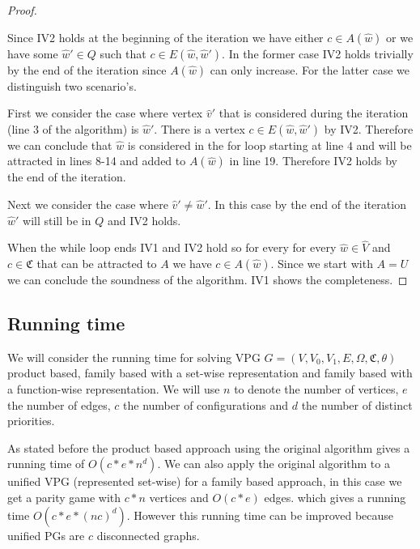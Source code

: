 \begin{theorem}
\begin{proof}
\begin{itemize}
			Since IV2 holds at the beginning of the iteration we have either $c \in A(\hat{w})$ or we have some $\hat{w}' \in Q$ such that $c \in E(\hat{w},\hat{w}')$. In the former case IV2 holds trivially by the end of the iteration since $A(\hat{w})$ can only increase. For the latter case we distinguish two scenario's. 
			
			First we consider the case where vertex $\hat{v}'$ that is considered during the iteration (line 3 of the algorithm) is $\hat{w}'$. There is a vertex $c \in E(\hat{w},\hat{w}')$ by IV2. Therefore we can conclude that $\hat{w}$ is considered in the for loop starting at line $4$ and will be attracted in lines 8-14 and added to $A(\hat{w})$ in line 19. Therefore IV2 holds by the end of the iteration.
			
			Next we consider the case where $\hat{v}' \neq \hat{w}'$. In this case by the end of the iteration $\hat{w}'$ will still be in $Q$ and IV2 holds.
		\end{itemize}
	
		When the while loop ends IV1 and IV2 hold so for every for every $\hat{w} \in \hat{V}$ and $c \in \mathfrak{C}$ that can be attracted to $A$ we have $c \in A(\hat{w})$. Since we start with $A = U$ we can conclude the soundness of the algorithm. IV1 shows the completeness.
	\end{proof}
\end{theorem}


\subsection{Running time}
We will consider the running time for solving VPG $G = (V,V_0,V_1,E,\Omega,\mathfrak{C},\theta)$ product based, family based with a set-wise representation and family based with a function-wise representation. We will use $n$ to denote the number of vertices, $e$ the number of edges, $c$ the number of configurations and $d$ the number of distinct priorities.

As stated before the product based approach using the original algorithm gives a running time of $O(c * e * n^d)$. We can also apply the original algorithm to a unified VPG (represented set-wise) for a family based approach, in this case we get a parity game with $c*n$ vertices and $O(c*e)$ edges. which gives a running time $O(c*e*(nc)^d)$. However this running time can be improved because unified PGs are $c$ disconnected graphs.

